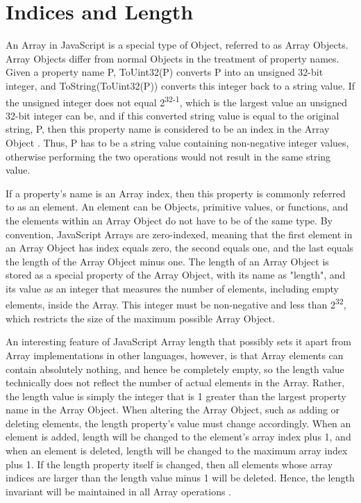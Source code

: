 \documentclass[a4paper,11pt,twoside]{report}
\begin{document}
\section{Indices and Length}
An Array in JavaScript is a special type of Object, referred to as Array Objects. Array Objects differ from normal Objects in the treatment of property names. Given a property name P, ToUint32(P) converts P into an unsigned 32-bit integer, and ToString(ToUint32(P)) converts this integer back to a string value. If the unsigned integer does not equal 2\textsuperscript{32-1}, which is the largest value an unsigned 32-bit integer can be, and if this converted string value is equal to the original string, P, then this property name is considered to be an index in the Array Object \cite{EcmaScript}. Thus, P has to be a string value containing non-negative integer values, otherwise performing the two operations would not result in the same string value. 

If a property's name is an Array index, then this property is commonly referred to as an element. An element can be Objects, primitive values, or functions, and the elements within an Array Object do not have to be of the same type. By convention, JavaScript Arrays are zero-indexed, meaning that the first element in an Array Object has index equals zero, the second equals one, and the last equals the length of the Array Object minus one. The length of an Array Object is stored as a special property of the Array Object, with its name as "length", and its value as an integer that measures the number of elements, including empty elements, inside the Array. This integer must be non-negative and less than 2\textsuperscript{32}, which restricts the size of the maximum possible Array Object. 

An interesting feature of JavaScript Array length that possibly sets it apart from Array implementations in other languages, however, is that Array elements can contain absolutely nothing, and hence be completely empty, so the length value technically does not reflect the number of actual elements in the Array. Rather, the length value is simply the integer that is 1 greater than the largest property name in the Array Object. When altering the Array Object, such as adding or deleting elements, the length property's value must change accordingly. When an element is added, length will be changed to the element's array index plus 1, and when an element is deleted, length will be changed to the maximum array index plus 1. If the length property itself is changed, then all elements whose array indices are larger than the length value minus 1 will be deleted. Hence, the length invariant will be maintained in all Array operations \cite{EcmaScript}.
\end{document}
